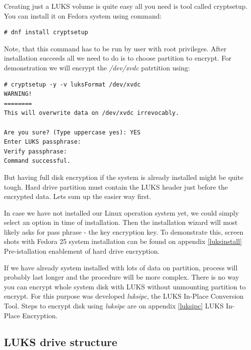 Creating just a LUKS volume is quite easy all you need is tool called cryptsetup.
You can install it on Fedora system using command:
\begin{lstlisting}[columns=fixed,basicstyle=\ttfamily\footnotesize,tabsize=4,backgroundcolor=\color{yellow!10}]
# dnf install cryptsetup
\end{lstlisting}
Note, that this command has to be run by user with root privileges.
After installation succeeds all we need to do is to choose partition to encrypt.
For demonstration we will encrypt the {\it /dev/xvdc} patrtition using:
\begin{lstlisting}[columns=fixed,basicstyle=\ttfamily\footnotesize,tabsize=4,backgroundcolor=\color{yellow!10}]
# cryptsetup -y -v luksFormat /dev/xvdc
WARNING!
========
This will overwrite data on /dev/xvdc irrevocably.

Are you sure? (Type uppercase yes): YES
Enter LUKS passphrase:
Verify passphrase:
Command successful.
\end{lstlisting}
But having full disk encryption if the system is already installed might be quite tough.
Hard drive partition must contain the LUKS header just before the encrypted data.
Lets sum up the easier way first.

In case we have not installed our Linux operation system yet, we could simply select an option in time of installation.
Then the installation wizard will most likely asks for pass phrase - the key encryption key.
To demonstrate this, screen shots with Fedora 25 system installation can be found on appendix \ref{luksinstall} Pre-istallation enablement of hard drive encryption.

If we have already system installed with lots of data on partition, process will probably last longer and the procedure will be more complex.
There is no way you can encrypt whole system disk with LUKS without unmounting partition to encrypt.
For this purpose was developed {\it luksipc}, the LUKS In-Place Conversion Tool.
Steps to encrypt disk using {\it luksipc} are on appendix \ref{luksipc} LUKS In-Place Encryption.

\subsection{LUKS drive structure}

